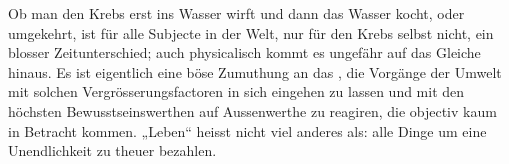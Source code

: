 Ob man den Krebs erst ins Wasser wirft und dann das Wasser kocht, oder umgekehrt, ist für alle Subjecte in der Welt, nur für den Krebs selbst nicht, ein blosser Zeitunterschied; auch physicalisch kommt es ungefähr auf das Gleiche hinaus. Es ist eigentlich eine böse Zumuthung an das , die Vorgänge der Umwelt mit solchen Vergrösserungsfactoren in sich eingehen zu lassen und mit den höchsten Bewusstseinswerthen auf Aussenwerthe zu reagiren, die objectiv kaum in Betracht kommen. „Leben“ heisst nicht viel anderes als: alle Dinge um eine Unendlichkeit zu theuer bezahlen.
\par

